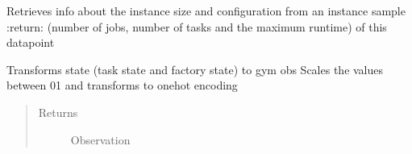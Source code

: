 \documentclass[letterpaper,10pt,english]{sphinxmanual}
\begin{document}
\begin{fulllineitems}
\begin{fulllineitems}
\label{\detokenize{environments:environments.env_tetris_scheduling.Env.get_instance_info}}
\sphinxAtStartPar
Retrieves info about the instance size and configuration from an instance sample
:return: (number of jobs, number of tasks and the maximum runtime) of this datapoint

\end{fulllineitems}


\begin{fulllineitems}
\label{\detokenize{environments:environments.env_tetris_scheduling.Env.state_obs}}
\sphinxAtStartPar
Transforms state (task state and factory state) to gym obs
Scales the values between 0\sphinxhyphen{}1 and transforms to onehot encoding
\begin{quote}\begin{description}
\item[{Returns}] \leavevmode
\sphinxAtStartPar
Observation

\end{description}\end{quote}

\end{fulllineitems}



\end{fulllineitems}
\end{document}
